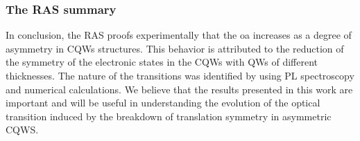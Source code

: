 \subsubsection{The RAS summary}
\label{subsubsec:chapter-3-ras-conclusions}
\vspace{-10mm}
In conclusion, the RAS proofs experimentally that the \gls{oa} increases as a degree of asymmetry in CQWs structures. This behavior is attributed to the reduction of the symmetry of the electronic states in the CQWs with QWs of different thicknesses. The nature of the transitions was identified by
using PL spectroscopy and numerical calculations. We believe
that the results presented in this work are important and will
be useful in understanding the evolution of the optical transition induced by the breakdown of translation symmetry in asymmetric CQWS.
















